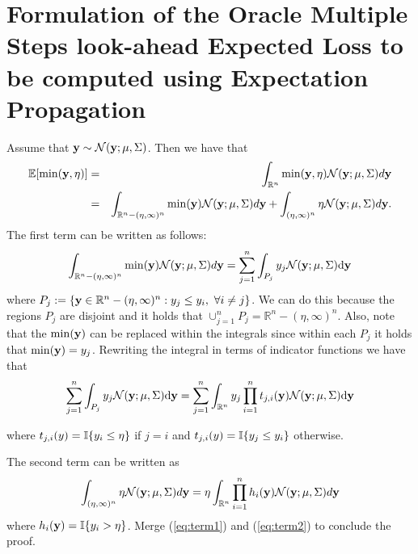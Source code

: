 \documentclass[twoside]{article}
\newcommand{\ud}{\mathrm{d}}
\newcommand{\E}{\mathbb{E}}
\newcommand{\N}{\mathcal{N}}
\newcommand{\IR}{\mathbb{R}}
\begin{document}
\section{Formulation of the Oracle Multiple Steps look-ahead Expected Loss to be computed using Expectation Propagation}
Assume that $\dataVector \sim \N(\dataVector; \mu, \Sigma)$. Then we have that
\begin{eqnarray}\nonumber
\E[\min (\dataVector,\eta)] & = & \int_{\IR^n} \min (\dataVector,\eta)  \N(\dataVector; \mu, \Sigma) d\dataVector\\ \nonumber
& = & \int_{\IR^n - (\eta,\infty)^n } \min (\dataVector)  \N(\dataVector; \mu, \Sigma) d\dataVector + \int_{(\eta,\infty)^n} \eta  \N(\dataVector; \mu, \Sigma) d\dataVector.  \nonumber
\end{eqnarray}
The first term can be written as follows:
\begin{equation}
 \int_{\IR^n - (\eta,\infty)^n } \min (\dataVector)  \N(\dataVector; \mu, \Sigma) d\dataVector  =    \sum_{j=1}^n \int_{P_j} \dataScalar_j \N(\dataVector; \mu, \Sigma) \ud \dataVector \nonumber
\end{equation}\nonumber
where $P_j := \{ \dataVector \in\IR^n - (\eta,\infty)^n  : \dataScalar_j \leq \dataScalar_i,\,\, \forall i \neq j \}$. We can do this because the regions $P_j$ are disjoint and it holds that $\cup_{j=1}^{n}P_j = \IR^n - (\eta,\infty)^n $.  Also, note that the $\min(\mathbf{y})$ can be replaced within the integrals since within each $P_j$ it holds that $\min(\mathbf{y}) = y_j$. Rewriting the integral in terms of indicator functions we have that
\begin{eqnarray}\label{eq:term1}
 \sum_{j=1}^n \int_{P_j} \dataScalar_j \N(\dataVector; \mu, \Sigma) \ud \dataVector   =  \sum_{j=1}^n  \int_{\IR^n} \dataScalar_j \prod_{i=1}^n t_{j,i}(\dataVector) \N(\dataVector; \mu, \Sigma) \ud \dataVector 
\end{eqnarray}

where $t_{j,i}(y) =\mathbb{I}\{y_i \leq\eta\}$ if $j=i$ and $t_{j,i}(y) =\mathbb{I}\{y_j \leq y_i \}$ otherwise.

The second term can be written as
\begin{equation}\label{eq:term2}
 \int_{(\eta,\infty)^n } \eta  \N(\dataVector; \mu, \Sigma) d\dataVector = \eta\int_{\IR^n} \prod_{i=1}^nh_i(\dataVector) \N(\dataVector; \mu, \Sigma) d\dataVector
\end{equation}
where $h_i(\mathbf{y}) = \mathbb{I}\{y_i>\eta\}$.  Merge (\ref{eq:term1}) and (\ref{eq:term2}) to conclude the proof.
 
\end{document}
